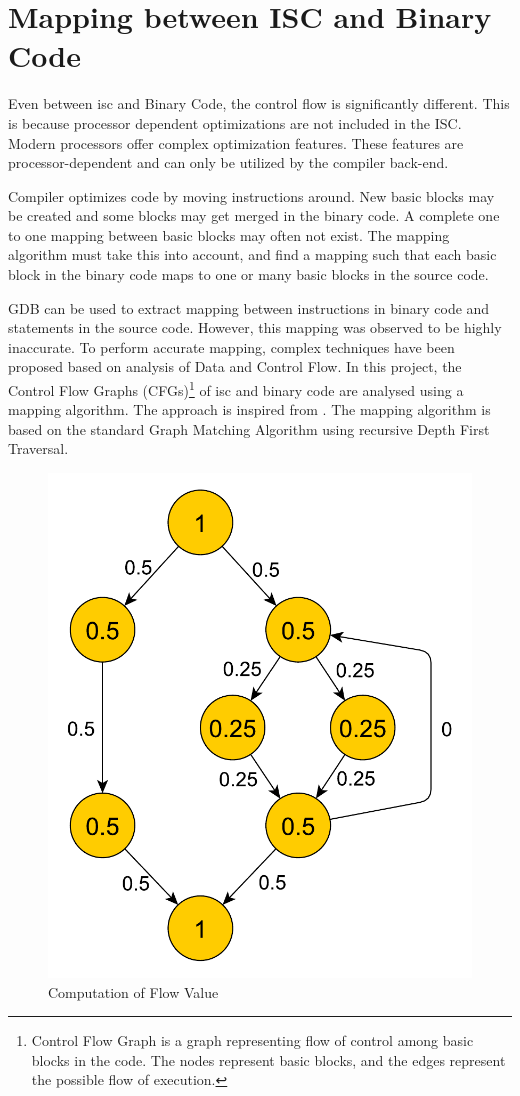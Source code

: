 \section{Mapping between ISC and Binary Code}
Even between \gls{isc} and Binary Code, the control flow is significantly different. This is because processor dependent optimizations are not included in the ISC. Modern processors offer complex optimization features. These features are processor-dependent and can only be utilized by the compiler back-end.

Compiler optimizes code by moving instructions around. New basic blocks may be created and some blocks may get merged in the binary code. A complete one to one mapping between basic blocks may often not exist. The mapping algorithm must take this into account, and find a mapping such that each basic block in the binary code maps to one or many basic blocks in the source code.

GDB can be used to extract mapping between instructions in binary code and statements in the source code. However, this mapping was observed to be highly inaccurate. To perform accurate mapping, complex techniques have been proposed based on analysis of Data and Control Flow. In this project, the Control Flow Graphs (CFGs)\footnote{Control Flow Graph is a graph representing flow of control among basic blocks in the code. The nodes represent basic blocks, and the edges represent the possible flow of execution.} of \gls{isc} and binary code are analysed using a mapping algorithm. The approach is inspired from \cite{RBA2013}. The mapping algorithm is based on the standard Graph Matching Algorithm using recursive Depth First Traversal.


\begin{figure}[h]
\centering
\includegraphics[width=.35\textwidth]{figures/flowValueComputation.pdf}
\caption{Computation of Flow Value}
\label{fig:flowValueComp}
\end{figure}

